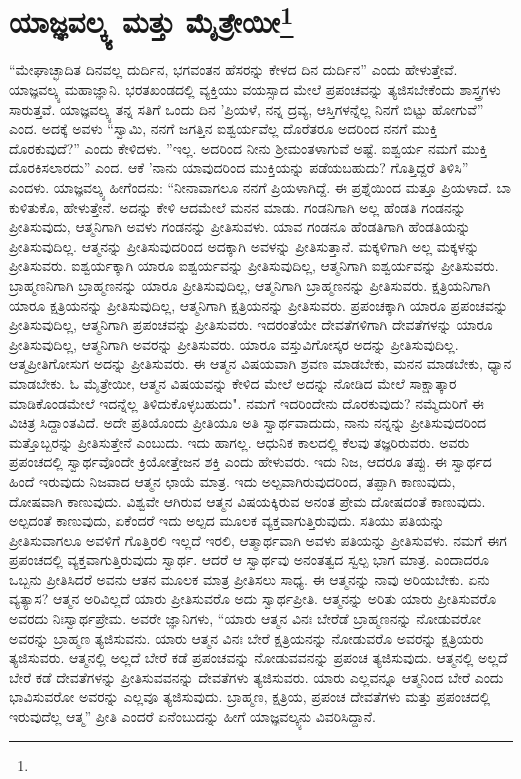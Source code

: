 
\chapter{ಯಾಜ್ಞವಲ್ಕ್ಯ ಮತ್ತು ಮೈತ್ರೇಯೀ\protect\footnote{}}

“ಮೇಘಾಚ್ಛಾದಿತ ದಿನವಲ್ಲ ದುರ್ದಿನ, ಭಗವಂತನ ಹೆಸರನ್ನು ಕೇಳದ ದಿನ ದುರ್ದಿನ'' ಎಂದು ಹೇಳುತ್ತೇವೆ. ಯಾಜ್ಞವಲ್ಕ್ಯ ಮಹಾಜ್ಞಾನಿ. ಭರತಖಂಡದಲ್ಲಿ ವ್ಯಕ್ತಿಯು ವಯಸ್ಸಾದ ಮೇಲೆ ಪ್ರಪಂಚವನ್ನು ತ್ಯಜಿಸಬೇಕೆಂದು ಶಾಸ್ತ್ರಗಳು ಸಾರುತ್ತವೆ. ಯಾಜ್ಞವಲ್ಕ್ಯ ತನ್ನ ಸತಿಗೆ ಒಂದು ದಿನ 'ಪ್ರಿಯಳೆ, ನನ್ನ ದ್ರವ್ಯ, ಆಸ್ತಿಗಳನ್ನೆಲ್ಲ ನಿನಗೆ ಬಿಟ್ಟು ಹೋಗುವೆ'' ಎಂದ. ಅದಕ್ಕೆ ಅವಳು “ಸ್ವಾಮಿ, ನನಗೆ ಜಗತ್ತಿನ ಐಶ್ವರ್ಯವೆಲ್ಲ ದೊರೆತರೂ ಅದರಿಂದ ನನಗೆ ಮುಕ್ತಿ ದೊರಕುವುದೆ?'' ಎಂದು ಕೇಳಿದಳು. ''ಇಲ್ಲ. ಅದರಿಂದ ನೀನು ಶ‍್ರೀಮಂತಳಾಗುವೆ ಅಷ್ಟೆ. ಐಶ್ವರ್ಯ ನಮಗೆ ಮುಕ್ತಿ ದೊರಕಿಸಲಾರದು'' ಎಂದ. ಆಕೆ 'ನಾನು ಯಾವುದರಿಂದ ಮುಕ್ತಿಯನ್ನು ಪಡೆಯಬಹುದು? ಗೊತ್ತಿದ್ದರೆ ತಿಳಿಸಿ” ಎಂದಳು. ಯಾಜ್ಞವಲ್ಕ್ಯ ಹೀಗೆಂದನು: “ನೀನಾವಾಗಲೂ ನನಗೆ ಪ್ರಿಯಳಾಗಿದ್ದೆ. ಈ ಪ್ರಶ್ನೆಯಿಂದ ಮತ್ತೂ ಪ್ರಿಯಳಾದೆ. ಬಾ ಕುಳಿತುಕೊ, ಹೇಳುತ್ತೇನೆ. ಅದನ್ನು ಕೇಳಿ ಆದಮೇಲೆ ಮನನ ಮಾಡು. ಗಂಡನಿಗಾಗಿ ಅಲ್ಲ ಹೆಂಡತಿ ಗಂಡನನ್ನು ಪ್ರೀತಿಸುವುದು, ಆತ್ಮನಿಗಾಗಿ ಅವಳು ಗಂಡನನ್ನು ಪ್ರೀತಿಸುವಳು. ಯಾವ ಗಂಡನೂ ಹೆಂಡತಿಗಾಗಿ ಹೆಂಡತಿಯನ್ನು ಪ್ರೀತಿಸುವುದಿಲ್ಲ. ಆತ್ಮನನ್ನು ಪ್ರೀತಿಸುವುದರಿಂದ ಅದಕ್ಕಾಗಿ ಅವಳನ್ನು ಪ್ರೀತಿಸುತ್ತಾನೆ. ಮಕ್ಕಳಿಗಾಗಿ ಅಲ್ಲ ಮಕ್ಕಳನ್ನು ಪ್ರೀತಿಸುವರು. ಐಶ್ವರ್ಯಕ್ಕಾಗಿ ಯಾರೂ ಐಶ್ವರ್ಯವನ್ನು ಪ್ರೀತಿಸುವುದಿಲ್ಲ, ಆತ್ಮನಿಗಾಗಿ ಐಶ್ವರ್ಯವನ್ನು ಪ್ರೀತಿಸುವರು. ಬ್ರಾಹ್ಮಣನಿಗಾಗಿ ಬ್ರಾಹ್ಮಣನನ್ನು ಯಾರೂ ಪ್ರೀತಿಸುವುದಿಲ್ಲ, ಆತ್ಮನಿಗಾಗಿ ಬ್ರಾಹ್ಮಣನನ್ನು ಪ್ರೀತಿಸುವರು. ಕ್ಷತ್ರಿಯನಿಗಾಗಿ ಯಾರೂ ಕ್ಷತ್ರಿಯನನ್ನು ಪ್ರೀತಿಸುವುದಿಲ್ಲ, ಆತ್ಮನಿಗಾಗಿ ಕ್ಷತ್ರಿಯನನ್ನು ಪ್ರೀತಿಸುವರು. ಪ್ರಪಂಚಕ್ಕಾಗಿ ಯಾರೂ ಪ್ರಪಂಚವನ್ನು ಪ್ರೀತಿಸುವುದಿಲ್ಲ, ಆತ್ಮನಿಗಾಗಿ ಪ್ರಪಂಚವನ್ನು ಪ್ರೀತಿಸುವರು. ಇದರಂತೆಯೇ ದೇವತೆಗಳಿಗಾಗಿ ದೇವತೆಗಳನ್ನು ಯಾರೂ ಪ್ರೀತಿಸುವುದಿಲ್ಲ, ಆತ್ಮನಿಗಾಗಿ ಅವರನ್ನು ಪ್ರೀತಿಸುವರು. ಯಾರೂ ವಸ್ತುವಿಗೋಸ್ಕರ ಅದನ್ನು ಪ್ರೀತಿಸುವುದಿಲ್ಲ. ಆತ್ಮಪ್ರೀತಿಗೋಸುಗ ಅದನ್ನು ಪ್ರೀತಿಸುವರು. ಈ ಆತ್ಮನ ವಿಷಯವಾಗಿ ಶ್ರವಣ ಮಾಡಬೇಕು, ಮನನ ಮಾಡಬೇಕು, ಧ್ಯಾನ ಮಾಡಬೇಕು. ಓ ಮೈತ್ರೇಯೀ, ಆತ್ಮನ ವಿಷಯವನ್ನು ಕೇಳಿದ ಮೇಲೆ ಅದನ್ನು ನೋಡಿದ ಮೇಲೆ ಸಾಕ್ಷಾತ್ಕಾರ ಮಾಡಿಕೊಂಡಮೇಲೆ ಇದನ್ನೆಲ್ಲ ತಿಳಿದುಕೊಳ್ಳಬಹುದು". ನಮಗೆ ಇದರಿಂದೇನು ದೊರಕುವುದು? ನಮ್ಮೆದುರಿಗೆ ಈ ವಿಚಿತ್ರ ಸಿದ್ದಾಂತವಿದೆ. ಅದೇ ಪ್ರತಿಯೊಂದು ಪ್ರೀತಿಯೂ ಅತಿ ಸ್ವಾರ್ಥವಾದುದು, ನಾನು ನನ್ನನ್ನು ಪ್ರೀತಿಸುವುದರಿಂದ ಮತ್ತೊಬ್ಬರನ್ನು ಪ್ರೀತಿಸುತ್ತೇನೆ ಎಂಬುದು. ಇದು ಹಾಗಲ್ಲ. ಆಧುನಿಕ ಕಾಲದಲ್ಲಿ ಕೆಲವು ತಜ್ಞರಿರುವರು. ಅವರು ಪ್ರಪಂಚದಲ್ಲಿ ಸ್ವಾರ್ಥವೊಂದೇ ಕ್ರಿಯೋತ್ತೇಜನ ಶಕ್ತಿ ಎಂದು ಹೇಳುವರು. ಇದು ನಿಜ, ಆದರೂ ತಪ್ಪು. ಈ ಸ್ವಾರ್ಥದ ಹಿಂದೆ ಇರುವುದು ನಿಜವಾದ ಆತ್ಮನ ಛಾಯೆ ಮಾತ್ರ. ಇದು ಅಲ್ಪವಾಗಿರುವುದರಿಂದ, ತಪ್ಪಾಗಿ ಕಾಣುವುದು, ದೋಷವಾಗಿ ಕಾಣುವುದು. ವಿಶ್ವವೇ ಆಗಿರುವ ಆತ್ಮನ ವಿಷಯಕ್ಕಿರುವ ಅನಂತ ಪ್ರೇಮ ದೋಷದಂತೆ ಕಾಣುವುದು. ಅಲ್ಪದಂತೆ ಕಾಣುವುದು, ಏಕೆಂದರೆ ಇದು ಅಲ್ಪದ ಮೂಲಕ ವ್ಯಕ್ತವಾಗುತ್ತಿರುವುದು. ಸತಿಯು ಪತಿಯನ್ನು ಪ್ರೀತಿಸುವಾಗಲೂ ಅವಳಿಗೆ ಗೊತ್ತಿರಲಿ ಇಲ್ಲದೆ ಇರಲಿ, ಆತ್ಮಾರ್ಥವಾಗಿ ಅವಳು ಪತಿಯನ್ನು ಪ್ರೀತಿಸುವಳು. ನಮಗೆ ಈಗ ಪ್ರಪಂಚದಲ್ಲಿ ವ್ಯಕ್ತವಾಗುತ್ತಿರುವುದು ಸ್ವಾರ್ಥ. ಆದರೆ ಆ ಸ್ವಾರ್ಥವು ಅನಂತತ್ವದ ಸ್ವಲ್ಪ ಭಾಗ ಮಾತ್ರ. ಎಂದಾದರೂ ಒಬ್ಬನು ಪ್ರೀತಿಸಿದರೆ ಅವನು ಆತನ ಮೂಲಕ ಮಾತ್ರ ಪ್ರೀತಿಸಲು ಸಾಧ್ಯ. ಈ ಆತ್ಮನನ್ನು ನಾವು ಅರಿಯಬೇಕು. ಏನು ವ್ಯತ್ಯಾಸ? ಆತ್ಮನ ಅರಿವಿಲ್ಲದೆ ಯಾರು ಪ್ರೀತಿಸುವರೊ ಅದು ಸ್ವಾರ್ಥಪ್ರೀತಿ. ಆತ್ಮನನ್ನು ಅರಿತು ಯಾರು ಪ್ರೀತಿಸುವರೊ ಅವರದು ನಿಃಸ್ವಾರ್ಥಪ್ರೇಮ. ಅವರೇ ಜ್ಞಾನಿಗಳು, “ಯಾರು ಆತ್ಮನ ವಿನಃ ಬೇರೆಡೆ ಬ್ರಾಹ್ಮಣನನ್ನು ನೋಡುವರೋ ಅವರನ್ನು ಬ್ರಾಹ್ಮಣ ತ್ಯಜಿಸುವನು. ಯಾರು ಆತ್ಮನ ವಿನಃ ಬೇರೆ ಕ್ಷತ್ರಿಯನನ್ನು ನೋಡುವರೊ ಅವರನ್ನು ಕ್ಷತ್ರಿಯರು ತ್ಯಜಿಸುವರು. ಆತ್ಮನಲ್ಲಿ ಅಲ್ಲದೆ ಬೇರೆ ಕಡೆ ಪ್ರಪಂಚವನ್ನು ನೋಡುವವನನ್ನು ಪ್ರಪಂಚ ತ್ಯಜಿಸುವುದು. ಆತ್ಮನಲ್ಲಿ ಅಲ್ಲದೆ ಬೇರೆ ಕಡೆ ದೇವತೆಗಳನ್ನು ಪ್ರೀತಿಸುವವನನ್ನು ದೇವತೆಗಳು ತ್ಯಜಿಸುವರು. ಯಾರು ಎಲ್ಲವನ್ನೂ ಆತ್ಮನಿಂದ ಬೇರೆ ಎಂದು ಭಾವಿಸುವರೋ ಅವರನ್ನು ಎಲ್ಲವೂ ತ್ಯಜಿಸುವುದು. ಬ್ರಾಹ್ಮಣ, ಕ್ಷತ್ರಿಯ, ಪ್ರಪಂಚ ದೇವತೆಗಳು ಮತ್ತು ಪ್ರಪಂಚದಲ್ಲಿ ಇರುವುದೆಲ್ಲ ಆತ್ಮ” ಪ್ರೀತಿ ಎಂದರೆ ಏನೆಂಬುದನ್ನು ಹೀಗೆ ಯಾಜ್ಞವಲ್ಕ್ಯನು ವಿವರಿಸಿದ್ದಾನೆ.

